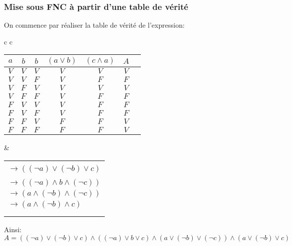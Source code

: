 \documentclass{scrartcl}
\begin{document}
			\subsubsection{Mise sous FNC à partir d'une table de vérité}
					On commence par réaliser la table de vérité de l'expression:
					\begin{center}
					\begin{tabular}{c c}
					\begin{tabular}{| c c c | c | c | c | c }
						\hline
						$a$ & $b$ & $b$   &  $(a\vee b)$ & $(c \wedge a)$ & $A$ \\
						\hline
						$V$ & $V$ & $V$   &     $V$      &     $V$        & $V$ \\
						\hline
						$V$ & $V$ & $F$   &     $V$      &     $F$        & $F$ \\
						\hline
						$V$ & $F$ & $V$   &     $V$      &     $V$        & $V$ \\
						\hline
						$V$ & $F$ & $F$   &     $V$      &     $F$        & $F$ \\
						\hline
						$F$ & $V$ & $V$   &     $V$      &     $F$        & $F$ \\
						\hline
						$F$ & $V$ & $F$   &     $V$      &     $F$        & $F$ \\
						\hline
						$F$ & $F$ & $V$   &     $F$      &     $F$        & $V$ \\
						\hline
						$F$ & $F$ & $F$   &     $F$      &     $F$        & $V$ \\
						\hline
					\end{tabular}
					& \begin{tabular}{l}
					\\ \\ $\rightarrow ((\neg a) \vee (\neg b) \vee c)$ \\ \\
					$\rightarrow ((\neg a) \wedge b \wedge (\neg c))$ \\
					$\rightarrow (a \wedge (\neg b) \wedge (\neg c))$ \\
					$\rightarrow (a \wedge (\neg b) \wedge c)$ \\ \\ \\ 
					\end{tabular}
					\end{tabular}
					\end{center}
					Ainsi:
					\[ 
						\boxed{A = ((\neg a) \vee (\neg b) \vee c) \wedge ((\neg a) \vee b \vee c) \wedge (a \vee (\neg b) \vee (\neg c)) \wedge (a \vee (\neg b) \vee c)}
					\]
\end{document}
